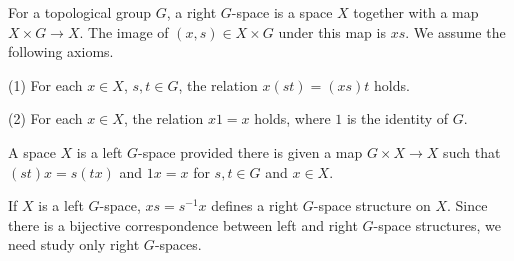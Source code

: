 For a topological group $G$, a right $G$-space is a space $X$ together with a map $X \times G \rightarrow X$. The image of $(x, s) \in X \times G$ under this map is $xs$. We assume the following axioms.

(1) For each $x \in X$, $s, t \in G$, the relation $x(st) = (xs)t$ holds.

(2) For each $x \in X$, the relation $x1 = x$ holds, where $1$ is the identity of $G$.

A space $X$ is a left $G$-space provided there is given a map $G \times X \rightarrow X$ such that $(st)x = s(tx)$ and $1x = x$ for $s, t \in G$ and $x \in X$.

If $X$ is a left $G$-space, $xs = s^{-1}x$ defines a right $G$-space structure on $X$. Since there is a bijective correspondence between left and right $G$-space structures, we need study only right $G$-spaces.
